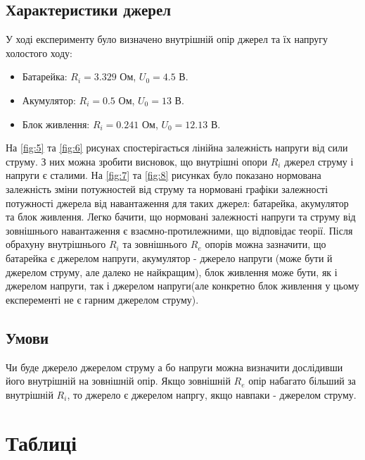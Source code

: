\documentclass[a4paper,12pt]{article}
\begin{document}
\begin{justify}
	\subsection{Характеристики джерел}
	У ході експерименту було визначено внутрішній опір джерел та їх напругу холостого ходу:
	\begin{itemize}
		\item Батарейка: $R_i=3.329$ Ом, $U_0=4.5$ В.
		\item Акумулятор: $R_i=0.5$ Ом, $U_0=13$ В.
		\item Блок живлення: $R_i=0.241$ Ом, $U_0=12.13$ В.
	\end{itemize} 
	На \ref{fig:5} та \ref{fig:6} рисунах спостерігається лінійна залежність напруги від сили струму. З них можна зробити висновок, що  внутрішні опори $R_i$ джерел струму і напруги є сталими. 
	На \ref{fig:7} та \ref{fig:8} рисунках було показано нормована залежність зміни потужностей від струму та нормовані графіки залежності потужності джерела від навантаження для таких джерел: батарейка, акумулятор та блок живлення. Легко бачити, що нормовані залежності напруги та струму від зовнішнього навантаження є взаємно-протилежними, що відповідає теорії. Після обрахуну внутрішнього $R_i$ та зовнішнього $R_e$ опорів можна зазначити, що батарейка є джерелом напруги, акумулятор - джерело напруги (може бути й джерелом струму, але далеко не найкращим), блок живлення може бути, як і джерелом напруги, так і джерелом напруги(але конкретно блок живлення у цьому експеременті не є гарним джерелом струму). 
	\subsection{Умови}
	Чи буде джерело джерелом струму а бо напруги можна визначити дослідивши його внутрішній на зовнішній опір. Якщо зовнішній $R_e$ опір набагато більший за внутрішній $R_i$, то джерело є джерелом напргу, якщо навпаки - джерелом струму.
	
\end{justify}


	\newpage
	\recalctypearea
	\section{Таблиці}
\end{document}
